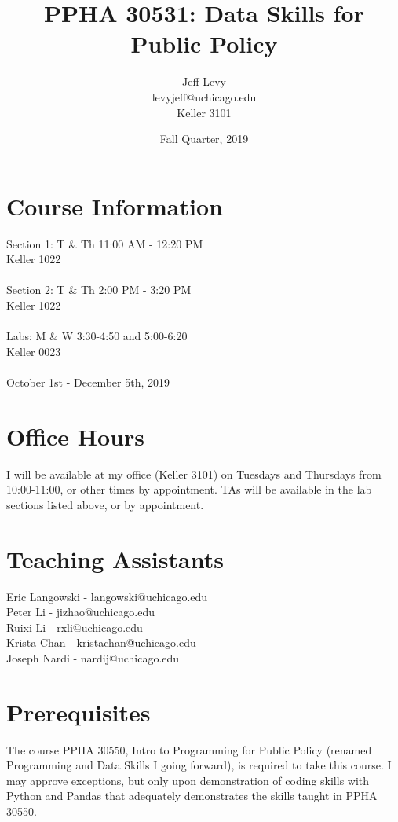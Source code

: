 \documentclass{article}
\author{
Jeff Levy\\
levyjeff@uchicago.edu\\
Keller 3101
}
\title{PPHA 30531: Data Skills for Public Policy}
\date{Fall Quarter, 2019}
\begin{document}
\maketitle

\section*{Course Information}
Section 1: T \& Th 11:00 AM - 12:20 PM \\
Keller 1022 \\
 \\
Section 2: T \& Th 2:00 PM - 3:20 PM \\
Keller 1022 \\
 \\
Labs: M \& W 3:30-4:50 and 5:00-6:20 \\
Keller 0023 \\
 \\
October 1st - December 5th, 2019

\section*{Office Hours}
I will be available at my office (Keller 3101) on Tuesdays and Thursdays from 10:00-11:00, or other times by appointment.  TAs will be available in the lab sections listed above, or by appointment.

\section*{Teaching Assistants}
Eric Langowski - langowski@uchicago.edu\\
Peter Li - jizhao@uchicago.edu\\
Ruixi Li - rxli@uchicago.edu\\
Krista Chan - kristachan@uchicago.edu\\
Joseph Nardi - nardij@uchicago.edu

\section*{Prerequisites}
The course PPHA 30550, Intro to Programming for Public Policy (renamed Programming and Data Skills I going forward), is required to take this course.  I may approve exceptions, but only upon demonstration of coding skills with Python and Pandas that adequately demonstrates the skills taught in PPHA 30550.
\end{document}
